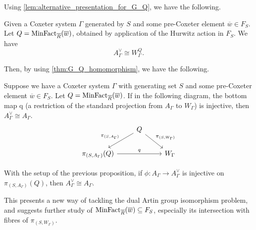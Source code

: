 Using \cref{lem:alternative_presentation_for_G_Q}, we have the following.

\begin{lemma}
	Given a Coxeter system $\Gamma$ generated by  $S$ and some pre-Coxeter element $\overline{w} \in F_S$.
	Let $Q=\operatorname{MinFact}_{\overline{R}}(\overline{w})$, obtained by application of the Hurwitz action in  $F_S$.
	We have
	\[
		A^\vee_\Gamma \cong W_\Gamma^Q
		.\]
\end{lemma}

Then, by using \cref{thm:G_Q_homomorphism}, we have the following.

\begin{proposition}
	Suppose we have a Coxeter system $\Gamma$ with generating set $S$ and some pre-Coxeter element $\overline{w} \in F_S$.
	Let $Q = \operatorname{MinFact}_{\overline{R}}(\overline{w})$.
	If in the following diagram, the bottom map q (a restriction of the standard projection from $A_\Gamma$ to  $W_\Gamma$) is injective, then $A^\vee_\Gamma \cong A_\Gamma$.
	\[
		\begin{tikzcd}
			& Q \ar[dl, "\pi_{(S,A_\Gamma)}"'] \ar[dr, "\pi_{(S,W_\Gamma)}"] & \\
			\pi_{(S,A_\Gamma)}(Q) \ar[rr, "q"] & & W_\Gamma
		\end{tikzcd}
	\]
\end{proposition}

\begin{corollary}
	With the setup of the previous proposition, if $\phi \colon A_\Gamma \to A^\vee_\Gamma$ is injective on $\pi_{(S,A_\Gamma)}(Q)$, then  $A^\vee_\Gamma \cong A_\Gamma$.
\end{corollary}
This presents a new way of tackling the dual Artin group isomorphism problem, and suggests further study of $\operatorname{MinFact}_{\overline{R}}(\overline{w}) \subseteq F_S$, especially its intersection with fibres of $\pi_{(S,W_\Gamma)}$.
